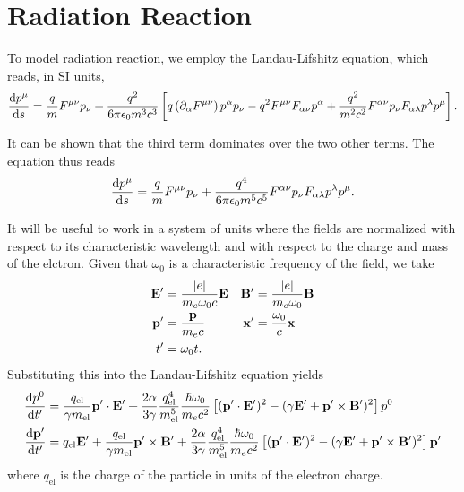 \documentclass[10pt,letterpaper,extrafontsizes, onecolumn,openright]{memoir}
\begin{document}
\section{Radiation Reaction}

To model radiation reaction, we employ the Landau-Lifshitz equation, which
reads, in SI units,
  \begin{equation}
    \dv{p^\mu}{s} = \frac{q}{m}F^{\mu\nu}p_\nu
                   +\frac{q^2}{6\pi\epsilon_0m^3c^3}
                      \left[
                        q\left(\partial_\alpha F^{\mu\nu}\right)p^\alpha p_\nu
                      - q^2 F^{\mu\nu}F_{\alpha\nu}p^\alpha
                      + \frac{q^2}{m^2c^2} F^{\alpha\nu}p_\nu F_{\alpha\lambda}p^\lambda p^\mu
                      \right].
  \end{equation}

It can be shown \cite{} that the third term dominates over the two other terms.
The equation thus reads
  \begin{equation}
    \dv{p^\mu}{s} = \frac{q}{m}F^{\mu\nu}p_\nu
                   +\frac{q^4}{6\pi\epsilon_0m^5c^5}F^{\alpha\nu}p_\nu F_{\alpha\lambda}p^\lambda p^\mu.
  \end{equation}

It will be useful to work in a system of units where the fields are normalized with
respect to its characteristic wavelength and with respect to the charge and mass
of the elctron. Given that $\omega_0$ is a characteristic frequency of the field,
we take
  \begin{subequations}
  \begin{align}
    \vb{E}' &= \frac{|e|}{m_e\omega_0 c} \vb{E} & \vb{B}' &= \frac{|e|}{m_e\omega_0}\vb{B} \\
    \vb{p}' &= \frac{\vb{p}}{m_ec}              & \vb{x}' &= \frac{\omega_0}{c}\vb{x}    \\
    t'      &= \omega_0 t.
  \end{align}
  \end{subequations}
Substituting this into the Landau-Lifshitz equation yields
  \begin{align}
    \dv{p^0}{t'}     &= \frac{q_\text{el}}{\gamma m_\text{el}}\vb{p}'\cdot\vb{E}'
                       +\frac{2\alpha}{3\gamma}\frac{q_\text{el}^4}{m_\text{el}^5}\frac{\hbar\omega_0}{m_ec^2}
                      \left[(\vb{p}'\cdot\vb{E}')^2-(\gamma\vb{E}'+\vb{p}'\times\vb{B}')^2\right]p^0 \\
    \dv{\vb{p}'}{t'} &= q_\text{el}\vb{E}' +\frac{q_\text{el}}{\gamma m_\text{el}}\vb{p}'\times\vb{B}'
                      +\frac{2\alpha}{3\gamma}\frac{q_\text{el}^4}{m_\text{el}^5}\frac{\hbar\omega_0}{m_ec^2}
                      \left[(\vb{p}'\cdot\vb{E}')^2-(\gamma\vb{E}'+\vb{p}'\times\vb{B}')^2\right]\vb{p}'
  \end{align}
where $q_\text{el}$ is the charge of the particle in units of the electron charge.
\end{document}
